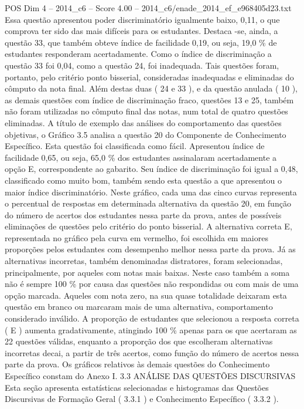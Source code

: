 \begin{textsample}{POS Dim 4 – 2014\_c6 – Score 4.00 – 2014\_c6/enade\_2014\_ef\_e968405d23.txt}
Essa questão apresentou poder discriminatório igualmente baixo, 0,11, o que comprova ter sido das mais difíceis para os estudantes.
Destaca -se, ainda, a questão 33, que também obteve índice de facilidade 0,19, ou seja, 19,0 \% de estudantes responderam acertadamente.
Como o índice de discriminação a questão 33 foi 0,04, como a questão 24, foi inadequada.
Tais questões foram, portanto, pelo critério ponto bisserial, consideradas inadequadas e eliminadas do cômputo da nota final.
Além destas duas ( 24 e 33 ), e da questão anulada ( 10 ), as demais questões com índice de discriminação fraco, questões 13 e 25, também não foram utilizadas no cômputo final das notas, num total de quatro questões eliminadas.
A título de exemplo das análises do comportamento das questões objetivas, o Gráfico 3.5 analisa a questão 20 do Componente de Conhecimento Específico.
Esta questão foi classificada como fácil.
Apresentou índice de facilidade 0,65, ou seja, 65,0 \% dos estudantes assinalaram acertadamente a opção E, correspondente ao gabarito.
Seu índice de discriminação foi igual a 0,48, classificado como muito bom, também sendo esta questão a que apresentou o maior índice discriminatório.
Neste gráfico, cada uma das cinco curvas representa o percentual de respostas em determinada alternativa da questão 20, em função do número de acertos dos estudantes nessa parte da prova, antes de possíveis eliminações de questões pelo critério do ponto bisserial.
A alternativa correta E, representada no gráfico pela curva em vermelho, foi escolhida em maiores proporções pelos estudantes com desempenho melhor nessa parte da prova.
Já as alternativas incorretas, também denominadas distratores, foram selecionadas, principalmente, por aqueles com notas mais baixas.
Neste caso também a soma não é sempre 100 \% por causa das questões não respondidas ou com mais de uma opção marcada.
Aqueles com nota zero, na sua quase totalidade deixaram esta questão em branco ou marcaram mais de uma alternativa, comportamento considerado inválido.
A proporção de estudantes que selecionou a resposta correta ( E ) aumenta gradativamente, atingindo 100 \% apenas para os que acertaram as 22 questões válidas, enquanto a proporção dos que escolheram alternativas incorretas decai, a partir de três acertos, como função do número de acertos nessa parte da prova.
Os gráficos relativos às demais questões do Conhecimento Específico constam do Anexo I. 3.3 ANÁLISE DAS QUESTÕES DISCURSIVAS Esta seção apresenta estatísticas selecionadas e histogramas das Questões Discursivas de Formação Geral ( 3.3.1 ) e Conhecimento Específico ( 3.3.2 ).

\end{textsample}
